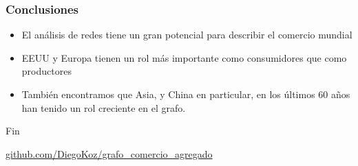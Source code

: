 \documentclass[professionalfont,fleqn]{beamer}
\begin{document}
		\begin{frame}
		\frametitle{Conclusiones}
		\begin{itemize}
			\item El análisis de redes tiene un gran potencial para describir el comercio mundial
			\item EEUU y Europa tienen un rol más importante como consumidores que como productores
			\item También encontramos que Asia, y China en particular, en los últimos 60 años han tenido un rol creciente en el grafo.
		\end{itemize}
		\end{frame}
	
		
		\begin{frame}
		\Huge{\centerline{Fin}}
		\vspace{1in}
		\large{\url{github.com/DiegoKoz/grafo_comercio_agregado}}
		\end{frame}
		
		
		
\end{document}
